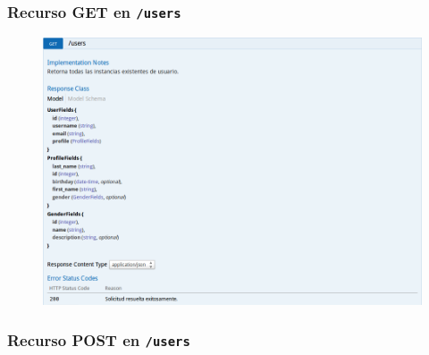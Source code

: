 \newpage


\subsubsection{Recurso GET en \texttt{/users}}

\begin{figure}[h]
  \centering
  \includegraphics[width=\textwidth,height=.75\textheight,keepaspectratio]{img/especificacion_api/userList_get}
  \label{userList_get}
\end{figure}

\newpage


\subsubsection{Recurso POST en \texttt{/users}}

